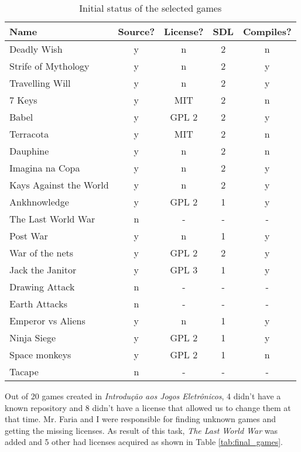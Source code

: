 \begin{table}[h!]
\centering
\caption{Initial status of the selected games}
\label{tab:first_games}
\begin{tabular}{lcccc}
\toprule
\textbf{Name} & \textbf{Source?} & \textbf{License?} & \textbf{SDL} & \textbf{Compiles?} \\
\midrule
Deadly Wish & y & n & 2 & n \\
Strife of Mythology & y & n & 2 & y \\
Travelling Will & y & n & 2 & y \\
7 Keys & y & MIT & 2 & n \\
Babel & y & GPL 2 & 2 & y \\
Terracota & y & MIT & 2 & n \\
Dauphine & y & n & 2 & n \\
Imagina na Copa & y & n & 2 & y \\
Kays Against the World & y & n & 2 & y \\
Ankhnowledge & y & GPL 2 & 1 & y \\
The Last World War & n & - & - & - \\
Post War & y & n & 1 & y \\
War of the nets & y & GPL 2 & 2 & y \\
Jack the Janitor & y & GPL 3 & 1 & y \\
Drawing Attack & n & - & - & - \\
Earth Attacks & n & - & - & - \\
Emperor vs Aliens & y & n & 1 & y \\
Ninja Siege & y & GPL 2 & 1 & y \\
Space monkeys & y & GPL 2 & 1 & n \\
Tacape & n & - & - & - \\
\bottomrule
\end{tabular}
\end{table}

Out of 20 games created in \textit{Introdu\c{c}\~ao aos Jogos Eletr\^onicos}, 4 didn't have a known repository and 8 didn't have a license that allowed us to change them at that time. Mr. Faria and I were responsible for finding unknown games and getting the missing licenses. As result of this task, \textit{The Last World War} was added and 5 other had licenses acquired as shown in Table \ref{tab:final_games}.

